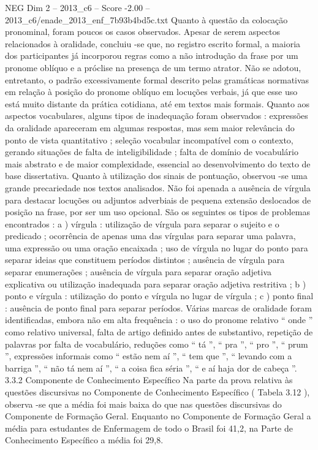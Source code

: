 \begin{textsample}{NEG Dim 2 – 2013\_c6 – Score -2.00 – 2013\_c6/enade\_2013\_enf\_7b93b4bd5c.txt}
Quanto à questão da colocação pronominal, foram poucos os casos observados.
Apesar de serem aspectos relacionados à oralidade, concluiu -se que, no registro escrito formal, a maioria dos participantes já incorporou regras como a não introdução da frase por um pronome oblíquo e a próclise na presença de um termo atrator.
Não se adotou, entretanto, o padrão excessivamente formal descrito pelas gramáticas normativas em relação à posição do pronome oblíquo em locuções verbais, já que esse uso está muito distante da prática cotidiana, até em textos mais formais.
Quanto aos aspectos vocabulares, alguns tipos de inadequação foram observados : expressões da oralidade apareceram em algumas respostas, mas sem maior relevância do ponto de vista quantitativo ; seleção vocabular incompatível com o contexto, gerando situações de falta de inteligibilidade ; falta de domínio de vocabulário mais abstrato e de maior complexidade, essencial ao desenvolvimento do texto de base dissertativa.
Quanto à utilização dos sinais de pontuação, observou -se uma grande precariedade nos textos analisados.
Não foi apenada a ausência de vírgula para destacar locuções ou adjuntos adverbiais de pequena extensão deslocados de posição na frase, por ser um uso opcional.
São os seguintes os tipos de problemas encontrados : a ) vírgula : utilização de vírgula para separar o sujeito e o predicado ; ocorrência de apenas uma das vírgulas para separar uma palavra, uma expressão ou uma oração encaixada ; uso de vírgula no lugar do ponto para separar ideias que constituem períodos distintos ; ausência de vírgula para separar enumerações ; ausência de vírgula para separar oração adjetiva explicativa ou utilização inadequada para separar oração adjetiva restritiva ; b ) ponto e vírgula : utilização do ponto e vírgula no lugar de vírgula ; c ) ponto final : ausência de ponto final para separar períodos.
Várias marcas de oralidade foram identificadas, embora não em alta frequência : o uso do pronome relativo “ onde ” como relativo universal, falta de artigo definido antes de substantivo, repetição de palavras por falta de vocabulário, reduções como “ tá ”, “ pra ”, “ pro ”, “ prum ”, expressões informais como “ estão nem aí ”, “ tem que ”, “ levando com a barriga ”, “ não tá nem aí ”, “ a coisa fica séria ”, “ e aí haja dor de cabeça ”. 3.3.2 Componente de Conhecimento Específico Na parte da prova relativa às questões discursivas no Componente de Conhecimento Específico ( Tabela 3.12 ), observa -se que a média foi mais baixa do que nas questões discursivas do Componente de Formação Geral.
Enquanto no Componente de Formação Geral a média para estudantes de Enfermagem de todo o Brasil foi 41,2, na Parte de Conhecimento Específico a média foi 29,8.

\end{textsample}
